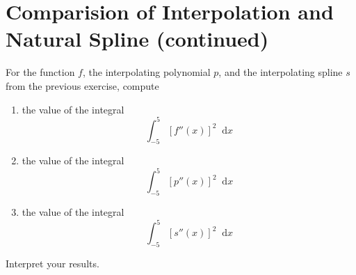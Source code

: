 \documentclass{article}
\newcommand*\diff{\mathop{}\!\mathrm{d}}
\theoremstyle{definition}
\begin{document}
\section{Comparision of Interpolation and Natural Spline (continued)}
For the function $f$, the interpolating polynomial $p$, and the interpolating spline $s$ from the previous exercise, compute
\begin{enumerate}
	\item the value of the integral
	\begin{equation}
		\int_{-5}^{5}\left[f''(x)\right]^2\diff x
	\end{equation}
	\item the value of the integral
	\begin{equation}
		\int_{-5}^{5}\left[p''(x)\right]^2\diff x
	\end{equation}
	\item the value of the integral
	\begin{equation}
		\int_{-5}^{5}\left[s''(x)\right]^2\diff x
	\end{equation}
\end{enumerate}
Interpret your results.
\end{document}
